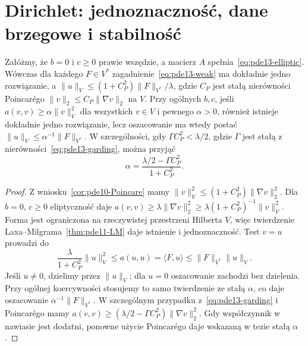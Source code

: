 \section{Dirichlet: jednoznaczność, dane brzegowe i stabilność}
\label{sec:pde13-dirichlet}
\begin{twierdzenie}
\label{thm:pde13-coercive}
Załóżmy, że $b=0$ i $c\geq0$ prawie wszędzie, a macierz $A$
spełnia~\eqref{eq:pde13-elliptic}. Wówczas dla każdego $F\in V^*$
zagadnienie~\eqref{eq:pde13-weak} ma dokładnie jedno rozwiązanie,
a $\|u\|_V\leq(1+C_P^2)\|F\|_{V^*}/\lambda$, gdzie
$C_P$ jest stałą nierówności Poincarégo
$\|v\|_2\leq C_P\|\nabla v\|_2$ na $V$.
Przy ogólnych $b,c$, jeśli $a(v,v)\geq\alpha\|v\|_V^2$
dla wszystkich $v\in V$ i pewnego $\alpha>0$, również istnieje
dokładnie jedno rozwiązanie, lecz oszacowanie ma wtedy postać
$\|u\|_V\leq\alpha^{-1}\|F\|_{V^*}$.
W szczególności, gdy $\Gamma C_P^2<\lambda/2$,
gdzie $\Gamma$ jest stałą z nierówności~\eqref{eq:pde13-garding},
można przyjąć
\[
 \alpha=\frac{\lambda/2-\Gamma C_P^2}{1+C_P^2}.
\]
\end{twierdzenie}
\begin{proof}
Z wniosku~\ref{cor:pde10-Poincare} mamy
$\|v\|_V^2\leq(1+C_P^2)\|\nabla v\|_2^2$.
Dla $b=0$, $c\geq0$ eliptyczność daje
$a(v,v)\geq\lambda\|\nabla v\|_2^2
\geq\lambda(1+C_P^2)^{-1}\|v\|_V^2$.
Forma jest ograniczona na rzeczywistej przestrzeni Hilberta $V$,
więc twierdzenie Laxa--Milgrama~\ref{thm:pde11-LM} daje
istnienie i jednoznaczność.
Test $v=u$ prowadzi do
\[
 \frac{\lambda}{1+C_P^2}\|u\|_V^2
 \leq a(u,u)=\langle F,u\rangle
 \leq\|F\|_{V^*}\|u\|_V.
\]
Jeśli $u\ne0$, dzielimy przez $\|u\|_V$; dla $u=0$
oszacowanie zachodzi bez dzielenia.
Przy ogólnej koercywności stosujemy to samo twierdzenie
ze stałą $\alpha$, co daje oszacowanie $\alpha^{-1}\|F\|_{V^*}$.
W szczególnym przypadku z~\eqref{eq:pde13-garding}
i Poincarégo mamy
$a(v,v)\geq(\lambda/2-\Gamma C_P^2)\|\nabla v\|_2^2$.
Gdy współczynnik w nawiasie jest dodatni, ponowne użycie
Poincarégo daje wskazaną w tezie stałą $\alpha$.
\end{proof}


